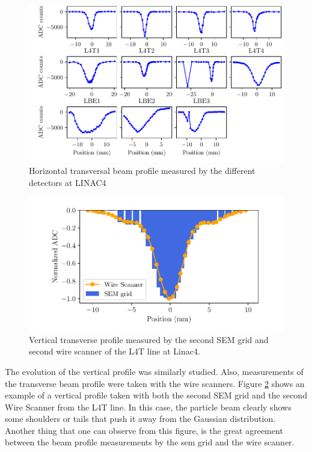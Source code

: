 \begin{figure}[h]
    \centering
    \includegraphics[width=1.0\columnwidth]{SigmaEvol/HorEvol.pdf}
    \caption{Horizontal transversal beam profile measured by the different detectors at LINAC4}
    \label{fig:HorizontalProf}
\end{figure}

\begin{figure}[h!]
    \centering
    \includegraphics[width=1.0\columnwidth]{VertProf/VertProf.pdf}
    \caption{Vertical transverse profile measured by the second SEM grid and second wire scanner of the L4T line at Linac4.}
    \label{fig:VertProf}
\end{figure}

The evolution of the vertical profile was similarly studied. Also, measurements of the transverse beam profile were taken with the wire scanners. Figure \ref{fig:VertProf} shows an example of a vertical profile taken with both the second SEM grid and the second Wire Scanner from the L4T line. In this case, the particle beam clearly shows some shoulders or tails that push it away from the Gaussian distribution. Another thing that one can observe from this figure, is the great agreement between the beam profile measurements by the sem grid and the wire scanner. 
